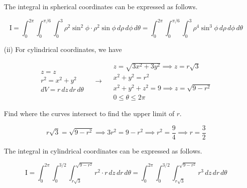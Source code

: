 \documentclass{article}
\begin{document}
\hfill

\noindent The integral in spherical coordinates can be expressed as follows.

\[\boxed{\mathrm{I}=\int_0^{2\pi}\int_0^{\pi/6}\int_{0}^3\rho^2\sin^2\phi\cdot\rho^2\sin\phi\,d\rho\,d\phi\,d\theta=\int_0^{2\pi}\int_0^{\pi/6}\int_{0}^3\rho^4\sin^3\phi\,d\rho\,d\phi\,d\theta}\]

\hfill

\noindent (ii) For cylindrical coordinates, we have

\[
\begin{array}{c}
z=z\\
r^2=x^2+y^2\\
dV=r\,dz\,dr\,d\theta
\end{array}\quad\rightarrow\quad
\begin{array}{c}
z=\sqrt{3x^2+3y^2}\implies z=r\sqrt3\\[0.1cm]
x^2+y^2=r^2\\[0.1cm]
x^2+y^2+z^2=9\implies z=\sqrt{9-r^2}\\[0.1cm]
0\leq\theta\leq2\pi
\end{array}
\]

\hfill

\noindent Find where the curves intersect to find the upper limit of $r$.

\[r\sqrt3=\sqrt{9-r^2}\implies3r^2=9-r^2\implies r^2=\frac94\implies r=\frac32\]

\hfill

\noindent The integral in cylindrical coordinates can be expressed as follows.

\[\boxed{\mathrm{I}=\int_0^{2\pi}\int_0^{3/2}\int_{r\sqrt3}^{\sqrt{9-r^2}}r^2\cdot r\,dz\,dr\,d\theta=\int_0^{2\pi}\int_0^{3/2}\int_{r\sqrt3}^{\sqrt{9-r^2}}r^3\,dz\,dr\,d\theta}\]
\end{document}
